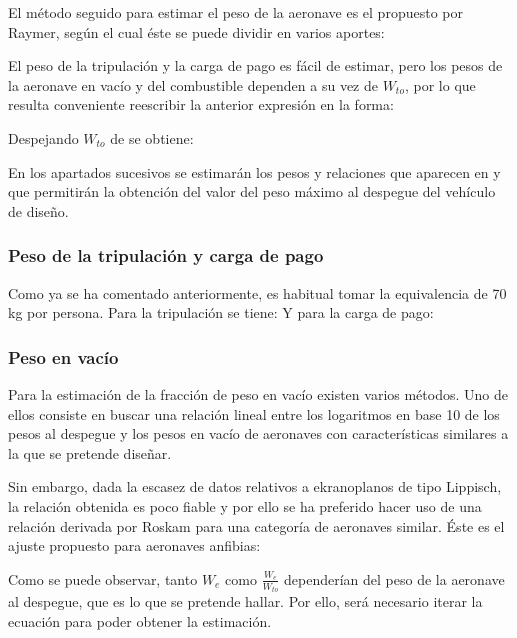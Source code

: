 El método seguido para estimar el peso de la aeronave es el propuesto por Raymer\cite{ref:raymer}, según el cual éste se puede dividir en varios aportes:

El peso de la tripulación y la carga de pago es fácil de estimar, pero los pesos de la aeronave en vacío y del combustible dependen a su vez de $W_{to}$, por lo que resulta conveniente reescribir la anterior expresión en la forma:

Despejando $W_{to}$ de  se obtiene:

En los apartados sucesivos se estimarán los pesos y relaciones que aparecen en  y que permitirán la obtención del valor del peso máximo al despegue del vehículo de diseño.


\subsubsection{Peso de la tripulación y carga de pago}
\label{sec:design:weights:cpl}

Como ya se ha comentado anteriormente, es habitual tomar la equivalencia de 70 kg por persona. Para la tripulación se tiene:
Y para la carga de pago:


\subsubsection{Peso en vacío}
\label{sec:design:weights:empty}

Para la estimación de la fracción de peso en vacío existen varios métodos. Uno de ellos consiste en buscar una relación lineal entre los logaritmos en base 10 de los pesos al despegue y los pesos en vacío de aeronaves con características similares a la que se pretende diseñar.

Sin embargo, dada la escasez de datos relativos a ekranoplanos de tipo Lippisch, la relación obtenida es poco fiable y por ello se ha preferido hacer uso de una relación derivada por Roskam\cite{ref:roskam} para una categoría de aeronaves similar. Éste es el ajuste propuesto para aeronaves anfibias:

Como se puede observar, tanto $W_e$ como $\frac{W_e}{W_{to}}$ dependerían del peso de la aeronave al despegue, que es lo que se pretende hallar. Por ello, será necesario iterar la ecuación  para poder obtener la estimación.


